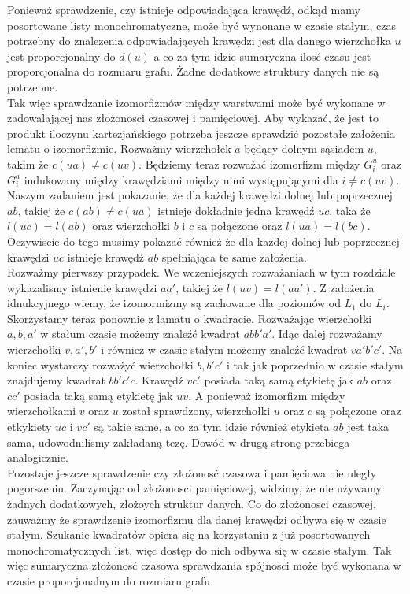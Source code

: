 \documentclass[12pt,a4paper,titlepage]{article}
\begin{document}
Ponieważ sprawdzenie, czy istnieje odpowiadająca krawędź, odkąd mamy posortowane listy monochromatyczne, może być wynonane w czasie stałym, czas potrzebny do znalezenia odpowiadających krawędzi jest dla danego wierzchołka $u$ jest proporcjonalny do $d(u)$ a co za tym idzie sumaryczna ilosć czasu jest proporcjonalna do rozmiaru grafu. Żadne dodatkowe struktury danych nie są potrzebne. \\
Tak więc sprawdzanie izomorfizmów między warstwami może być wykonane w zadowalającej nas złożonosci czasowej i pamięciowej. Aby wykazać, że jest to produkt iloczynu kartezjańskiego potrzeba jeszcze sprawdzić pozostałe założenia lematu o izomorfizmie. Rozważmy wierzchołek $a$ będący dolnym sąsiadem $u$, takim że $c(ua) \neq c(uv)$. Będziemy teraz rozważać izomorfizm między $G^u_i$ oraz $G^a_i$ indukowany między krawędziami między nimi występującymi dla $i \neq c(uv)$.\\
Naszym zadaniem jest pokazanie, że dla każdej krawędzi dolnej lub poprzecznej $ab$, takiej że $c(ab) \neq c(ua)$ istnieje dokładnie jedna krawędź $uc$, taka że $l(uc)=l(ab)$ oraz wierzchołki $b$ i $c$ są połączone oraz $l(ua)=l(bc)$. Oczywiscie do tego musimy pokazać również że dla każdej dolnej lub poprzecznej krawędzi $uc$ istnieje krawędź $ab$ spełniająca te same założenia.\\
Rozważmy pierwszy przypadek. We wczeniejszych rozważaniach w tym rozdziale wykazalismy istnienie krawędzi $aa'$, takiej że $l(uv)=l(aa')$. Z założenia idnukcyjnego wiemy, że izomormizmy są zachowane dla poziomów od $L_1$ do $L_i$. Skorzystamy teraz ponownie z lamatu o kwadracie. Rozważając wierzchołki $a,b,a'$ w stałum czasie możemy znaleźć kwadrat $abb'a'$. Idąc dalej rozważamy wierzchołki $v,a',b'$ i również w czasie stałym możemy znaleźć kwadrat $va'b'c'$. Na koniec wystarczy rozważyć wierzchołki $b,b'c'$ i tak jak poprzednio w czasie stałym znajdujemy kwadrat $bb'c'c$. Krawędź $vc'$ posiada taką samą etykietę jak $ab$ oraz $cc'$ posiada taką samą etykietę jak $uv$. A ponieważ izomorfizm między wierzchołkami $v$ oraz $u$ został sprawdzony, wierzchołki $u$ oraz $c$ są połączone oraz etkykiety $uc$ i $vc'$ są takie same, a co za tym idzie również etykieta $ab$ jest taka sama, udowodnilismy zakładaną tezę. Dowód w drugą stronę przebiega analogicznie.\\
Pozostaje jeszcze sprawdzenie czy złożonosć czasowa i pamięciowa nie uległy pogorszeniu. Zaczynając od złożonosci pamięciowej, widzimy, że nie używamy żadnych dodatkowych, złożoych struktur danych. Co do złożonosci czasowej, zauważmy że sprawdzenie izomorfizmu dla danej krawędzi odbywa się w czasie stałym. Szukanie kwadratów opiera się na korzystaniu z już posortowanych monochromatycznych list, więc dostęp do nich odbywa się w czasie stałym. Tak więc sumaryczna złożonosć czasowa sprawdzania spójnosci może być wykonana w czasie proporcjonalnym do rozmiaru grafu.\\
\newpage
\end{document}
